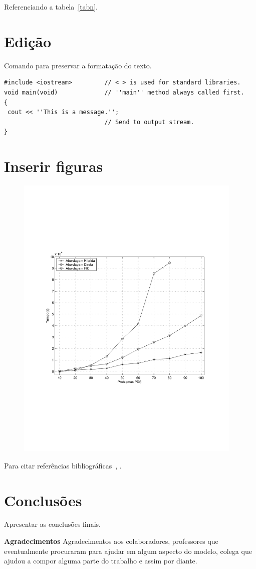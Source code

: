 \documentclass[12pt,fleqn]{article}
\begin{document}
Referenciando a tabela~\ref{tabn}.

\section{Edição}

Comando para preservar a formatação do texto.
\begin{verbatim}
#include <iostream>         // < > is used for standard libraries.
void main(void)             // ''main'' method always called first.
{
 cout << ''This is a message.'';
                            // Send to output stream.
}
\end{verbatim}

\section{Inserir figuras}

\begin{figure}[htb]
	\centering
		\includegraphics[height=14cm]{figura}
	\label{fig:pdsmodel}
\end{figure}


Para citar referências bibliográficas~\cite{Adler89}, \cite{Carmo05}.

\section{Conclusões}
Apresentar as conclusões finais.

\vspace{5mm}
{\bf{Agradecimentos}} Agradecimentos aos colaboradores, professores que eventualmente procuraram para ajudar em
algum aspecto do modelo, colega que ajudou a compor alguma parte do trabalho e assim por diante.




\end{document}
